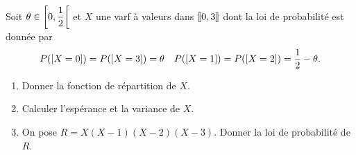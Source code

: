 \documentclass[a4paper, 11pt,reqno]{article}
\begin{document}

\begin{exercice}  \;
	Soit $\theta\in\left\lbrack 0,\displaystyle\frac{1}{2}\right\lbrack$ et $X$ une varf \`a valeurs dans $\llbracket  0,3\rrbracket$ dont la loi de probabilit\'e est donn\'ee par
	$$P(\lbrack X=0 \rbrack)= P(\lbrack X=3 \rbrack)=\theta \quad P(\lbrack X= 1\rbrack)=P(\lbrack X= 2\rbrack)= \displaystyle\frac{1}{2}-\theta.$$
	\begin{enumerate}
		\item Donner la fonction de r\'epartition de $X$.
		\item Calculer l'esp\'erance et la variance de $X$.
		\item On pose $R=X(X-1)(X-2)(X-3)$. Donner la loi de probabilit\'e de $R$.
	\end{enumerate}
\end{exercice}
\end{document}
